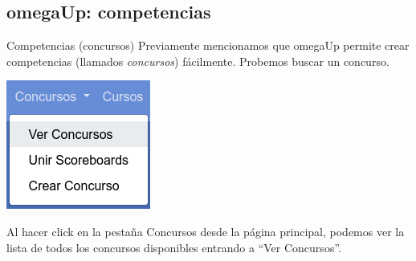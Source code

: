 \documentclass{beamer}
\begin{document}
    \subsection{omegaUp: competencias}
    \begin{frame}
    \end{frame}

    \begin{frame}{Competencias (concursos)}
        Previamente mencionamos que omegaUp permite crear competencias (llamados \textit{concursos}) fácilmente. \pause Probemos buscar un concurso. \vspace{8pt} \pause

        \begin{minipage}{.35\linewidth}
            \includegraphics[width=.9\linewidth]{./res/ou_contest_bar.png}
        \end{minipage}\pause
        \begin{minipage}{.64\linewidth}
            Al hacer click en la pestaña Concursos desde la página principal, podemos ver la lista de todos los concursos disponibles entrando a ``Ver Concursos''.
        \end{minipage}
    \end{frame}
\end{document}
